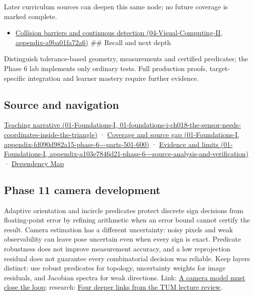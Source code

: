Later curriculum sources can deepen this same node; no future coverage is marked complete.

\begin{itemize}
\tightlist
\item
  \href{../04-Visual-Computing-II/main.pdf\#nameddest=appendix-a9ba01fa72a6}{Collision barriers and continuous detection (04-Visual-Computing-II, appendix-a9ba01fa72a6)} \#\# Recall and next depth
\end{itemize}

Distinguish tolerance-based geometry, measurements and certified predicates; the Phase 6 lab implements only ordinary tests. Full production proofs, target-specific integration and learner mastery require further evidence.

\subsection{Source and navigation}\label{appendix-341296fb3f64-source-and-navigation}

\href{../01-Foundations-I/main.pdf\#nameddest=01-foundations-i-ch018-the-sensor-needs-coordinates-inside-the-triangle}{Teaching narrative (01-Foundations-I, 01-foundations-i-ch018-the-sensor-needs-coordinates-inside-the-triangle)} · \href{../01-Foundations-I/main.pdf\#nameddest=appendix-fd090d982a15-phase-6---parts-501-600}{Coverage and source gap (01-Foundations-I, appendix-fd090d982a15-phase-6-\/-\/-parts-501-600)} · \href{../01-Foundations-I/main.pdf\#nameddest=appendix-a103e7846d21-phase-6---source-analysis-and-verification}{Evidence and limits (01-Foundations-I, appendix-a103e7846d21-phase-6-\/-\/-source-analysis-and-verification)} · \hyperref[appendix-4ad47bdd269a]{Dependency Map}

\subsection{Phase 11 camera development}\label{appendix-341296fb3f64-phase-11-camera-development}

Adaptive orientation and incircle predicates protect discrete sign decisions from floating-point error by refining arithmetic when an error bound cannot certify the result. Camera estimation has a different uncertainty: noisy pixels and weak observability can leave pose uncertain even when every sign is exact. Predicate robustness does not improve measurement accuracy, and a low reprojection residual does not guarantee every combinatorial decision was reliable. Keep layers distinct: use robust predicates for topology, uncertainty weights for image residuals, and Jacobian spectra for weak directions. Link: \hyperref[02-foundations-ii-ch037-a-camera-model-must-close-the-loop]{A camera model must close the loop}; research: \hyperref[02-foundations-ii-ch036-four-deeper-links-from-the-tum-lecture-review]{Four deeper links from the TUM lecture review}.
